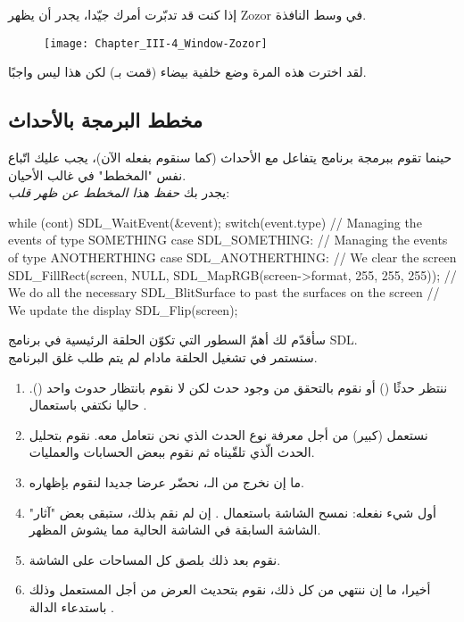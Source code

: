 إذا كنت قد تدبّرت أمرك جيّدا، يجدر أن يظهر 
\textenglish{Zozor}
في وسط النافذة.

\begin{figure}[H]
	\centering
	\texttt{[image: Chapter\_III-4\_Window-Zozor]}
\end{figure}

لقد اخترت هذه المرة وضع خلفية بيضاء (قمت بـ)
لكن هذا ليس واجبًا.

\subsection{مخطط البرمجة بالأحداث}

حينما تقوم ببرمجة برنامج يتفاعل مع الأحداث (كما سنقوم بفعله الآن)، يجب عليك اتّباع نفس "المخطط" في غالب الأحيان.\\
يجدر بك 
\textit{حفظ هذا المخطط عن ظهر قلب}:

\begin{Csource}
while (cont)
{
	SDL_WaitEvent(&event);
	switch(event.type)
	{
		// Managing the events of type SOMETHING
		case SDL_SOMETHING:
		// Managing the events of type ANOTHERTHING
		case SDL_ANOTHERTHING:
	}
	// We clear the screen
	SDL_FillRect(screen, NULL, SDL_MapRGB(screen->format, 255, 255, 255)); 
	// We do all the necessary SDL_BlitSurface to past the surfaces on the screen
	// We update the display
	SDL_Flip(screen);
}
\end{Csource}

سأقدّم لك أهمّ السطور التي تكوّن الحلقة الرئيسية في برنامج 
\textenglish{SDL}.\\
سنستمر في تشغيل الحلقة مادام لم يتم طلب غلق البرنامج.

\begin{enumerate}
	\item ننتظر حدثًا
	()
	أو نقوم بالتحقق من وجود حدث لكن لا نقوم بانتظار حدوث واحد 
	().
	حاليا نكتفي باستعمال 
	.
	\item نستعمل 
	(كبير) من أجل معرفة نوع الحدث الذي نحن نتعامل معه. نقوم بتحليل الحدث الّذي تلقّيناه ثم نقوم ببعض الحسابات والعمليات.
	\item ما إن نخرج من الـ،
	نحضّر عرضا جديدا لنقوم بإظهاره.
	\item أول شيء نفعله: نمسح الشاشة باستعمال
	.
	إن لم نقم بذلك، ستبقى بعض "آثار" الشاشة السابقة في الشاشة الحالية مما يشوش المظهر.
	\item نقوم بعد ذلك بلصق كل المساحات على الشاشة.
	\item أخيرا، ما إن ننتهي من كل ذلك، نقوم بتحديث العرض من أجل المستعمل وذلك باستدعاء الدالة
	.
\end{enumerate}

